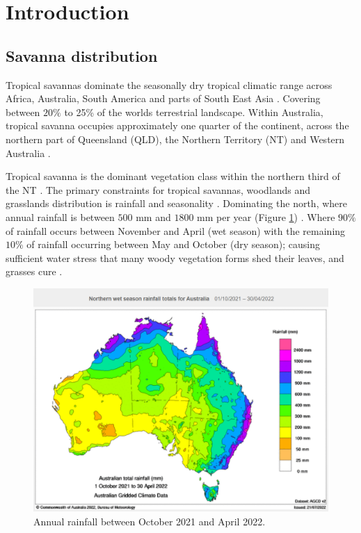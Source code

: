 \newpage
\section{Introduction}
\subsection{Savanna distribution}

Tropical savannas dominate the seasonally dry tropical climatic range across Africa, Australia, South America and parts of South East Asia \citep{murpheyetal2015}. Covering between $20\%$ \citep{murpheyetal2015, williamsetal1997} to 25\% \citep{collinsetal2009} of the worlds terrestrial landscape. Within Australia, tropical savanna occupies approximately one quarter of the continent, across the northern part of Queensland (QLD), the Northern Territory (NT) and Western Australia \citep{foxetal2001}.

Tropical savanna is the dominant vegetation class within the northern third of the NT \citep{houseHall2001}. The primary constraints for tropical savannas, woodlands and grasslands distribution is rainfall and seasonality \citep{foxetal2001, houseHall2001}. Dominating the north, where annual rainfall is between $500$ mm and $1800$ mm per year (Figure \ref{fig:rainfall}) \citep{williamsetal1997}. Where $90\%$ of rainfall occurs between November and April (wet season) with the remaining $10\%$ of rainfall occurring between May and October (dry season); causing sufficient water stress that many woody vegetation forms shed their leaves, and grasses cure \citep{williamsetal1997}.

\begin{figure}[h]
\centering
\includegraphics[scale=0.3]{images/bom_2022_wet_season.png}
\caption{Annual rainfall between October 2021 and April 2022.}
\label{fig:rainfall}
\end{figure}
\citep{bom2022}

